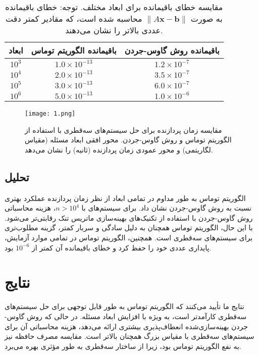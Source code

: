 \documentclass[a4paper,12pt]{article}
\renewcommand{\arraystretch}{1.2}    %
\begin{document}
\begin{table}[H]
\centering
\renewcommand{\arraystretch}{1.2} %
\setlength{\tabcolsep}{8pt} %
\begin{tabular}{|c|c|c|}
\hline
\textbf{ابعاد} & \textbf{باقیمانده الگوریتم توماس} & \textbf{باقیمانده روش گاوس-جردن} \\
\hline
$10^3$ & $1.0 \times 10^{-13}$ & $1.2 \times 10^{-7}$ \\
$10^4$ & $2.0 \times 10^{-13}$ & $3.5 \times 10^{-7}$ \\
$10^5$ & $3.0 \times 10^{-13}$ & $6.0 \times 10^{-7}$ \\
$10^6$ & $5.0 \times 10^{-13}$ & $1.0 \times 10^{-6}$ \\
\hline
\end{tabular}
\caption{مقایسه خطای باقیمانده برای ابعاد مختلف. \newline
توجه: خطای باقیمانده به صورت $\|A \mathbf{x} - \mathbf{b}\|$ محاسبه شده است، که مقادیر کمتر دقت عددی بالاتر را نشان می‌دهند.}
\end{table}

\begin{figure}[H]
\centering
\texttt{[image: 1.png]}
\caption{مقایسه زمان پردازنده برای حل سیستم‌های سه‌قطری با استفاده از الگوریتم توماس و روش گاوس-جردن. محور افقی ابعاد مسئله (مقیاس لگاریتمی) و محور عمودی زمان پردازنده (ثانیه) را نشان می‌دهد.}
\label{fig:comparison_plot}
\end{figure}

\subsection*{تحلیل}
الگوریتم توماس به طور مداوم در تمامی ابعاد از نظر زمان پردازنده عملکرد بهتری نسبت به روش گاوس-جردن نشان داد. برای سیستم‌های با \(n > 10^4\)، هزینه محاسباتی روش گاوس-جردن با استفاده از تکنیک‌های بهینه‌سازی ماتریس تنک رقابتی‌تر می‌شود. با این حال، الگوریتم توماس همچنان به دلیل سادگی و سربار کمتر، گزینه مطلوب‌تری برای سیستم‌های سه‌قطری است. همچنین، الگوریتم توماس در تمامی موارد آزمایش، پایداری عددی خود را حفظ کرد و خطای باقیمانده آن کمتر از \(10^{-6}\) بود.

\section*{نتایج}
نتایج ما تأیید می‌کنند که الگوریتم توماس به طور قابل توجهی برای حل سیستم‌های سه‌قطری کارآمدتر است، به ویژه با افزایش ابعاد مسئله. در حالی که روش گاوس-جردن بهینه‌سازی‌شده انعطاف‌پذیری بیشتری ارائه می‌دهد، هزینه محاسباتی آن برای سیستم‌های سه‌قطری با مقیاس بزرگ همچنان بالاتر است. مقایسه مصرف حافظه نیز به نفع الگوریتم توماس بود، زیرا از ساختار سه‌قطری به طور مؤثری بهره می‌برد.
\end{document}
